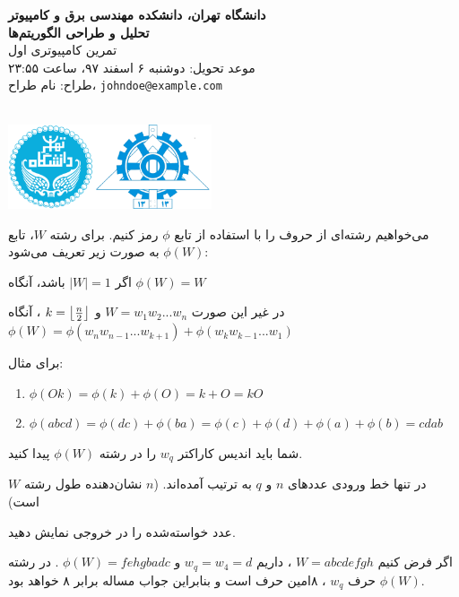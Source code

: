 \documentclass[11.5pt,a4paper,oneside]{article}
\makeatletter
\DeclarePairedDelimiter{\floor}{\lfloor}{\rfloor}
\renewcommand{\contestname}{
دانشگاه تهران، دانشکده مهندسی برق و کامپیوتر \\
تحلیل و طراحی الگوریتم‌ها \\
}
\renewcommand{\contestauthor}{
تمرین کامپیوتری اول \\ موعد تحویل: دوشنبه ۶ اسفند ۹۷، ساعت ۲۳:۵۵ \\ طراح:‌ نام طراح،
\texttt{johndoe@example.com}
}
\makeatother
\begin{document}
{\noindent \Large \bf \contestname}
{\contestauthor}

\begin{flushleft}
\nothing\\[-3.2cm]
\includegraphics[height=2.5cm]{../../../static/pics/ut-eng.png}
\end{flushleft}

\def\problemCode{encoding}
\def\problemEnglishTitle{}
\def\problemFarsiTitle{رمزنگاری}
\def\timeLimit{$2$ \second}
\def\memLimit{$256$ \megabytes}
\begin{problem}
می‌خواهیم رشته‌ای از حروف را با استفاده از تابع $\phi$ رمز کنیم.
برای رشته $W$، تابع
$\phi(W)$
به صورت زیر تعریف می‌شود:
\begin{shortitems}
\item
اگر
$|W|=1$
باشد، آنگاه
$\phi(W)=W$

\item
در غیر این صورت
$W=w_1 w_2 ... w_n$
و
$k=\floor*{n\over2}$
، آنگاه
$\phi(W) = \phi(w_n w_{n-1} ... w_{k+1}) + \phi(w_k w_{k-1} ... w_1)$
\end{shortitems}


برای مثال:
\begin{enumerate}
\item
$\phi(Ok)=\phi(k)+\phi(O)=k+O=kO$
\item
$\phi(abcd)=\phi(dc)+\phi(ba)=\phi(c)+\phi(d)+\phi(a)+\phi(b)=cdab$
\end{enumerate}

شما باید اندیس کاراکتر $w_q$ را در رشته
$\phi(W)$
پیدا کنید.

در تنها خط ورودی عددهای $n$ و $q$ به ترتیب آمده‌اند. ($n$ نشان‌دهنده طول رشته $W$ است)

\outputDescription
عدد خواسته‌شده را در خروجی نمایش دهید.

\sampleIO

\begin{example}
%
\end{example}

\sampleIODescription
اگر فرض کنیم
$W=abcdefgh$
، داریم
$w_q=w_4=d$
و
$\phi(W)=fehgbadc$
. در رشته 
$\phi(W)$
 حرف 
$w_q$
، ۸امین حرف است و بنابراین جواب مساله برابر ۸ خواهد بود.

\end{problem}
\end{document}
